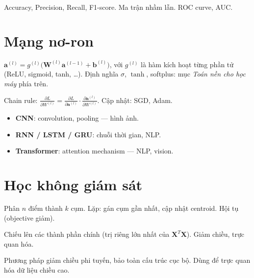 \documentclass[12pt,a4paper]{article}
\begin{document}
\begin{phuongphap}[title={Đánh giá phân loại}]
  Accuracy, Precision, Recall, F1-score. Ma trận nhầm lẫn. ROC curve, AUC.
\end{phuongphap}

\section{Mạng nơ-ron}
\label{sec:mang-no-ron}

\begin{dinhnghia}[title={Perceptron nhiều lớp (MLP)}]
  $\mathbf{a}^{(l)} = g^{(l)}\!\bigl(\mathbf{W}^{(l)}\mathbf{a}^{(l-1)} + \mathbf{b}^{(l)}\bigr)$,
  với $g^{(l)}$ là hàm kích hoạt từng phần tử (ReLU, sigmoid, tanh, \ldots).
  Định nghĩa $\sigma$, $\tanh$, softplus: mục \emph{Toán nền cho học máy} phía trên.
\end{dinhnghia}

\begin{phuongphap}[title={Backpropagation}]
  Chain rule: $\frac{\partial L}{\partial W^{(l)}} = \frac{\partial L}{\partial \mathbf{a}^{(l)}}\cdot\frac{\partial \mathbf{a}^{(l)}}{\partial W^{(l)}}$. Cập nhật: SGD, Adam.
\end{phuongphap}

\begin{tinhchat}[title={Kiến trúc phổ biến}]
  \begin{itemize}
    \item \textbf{CNN}: convolution, pooling --- hình ảnh.
    \item \textbf{RNN / LSTM / GRU}: chuỗi thời gian, NLP.
    \item \textbf{Transformer}: attention mechanism --- NLP, vision.
  \end{itemize}
\end{tinhchat}

\section{Học không giám sát}

\begin{phuongphap}[title={K-Means}]
  Phân $n$ điểm thành $k$ cụm. Lặp: gán cụm gần nhất, cập nhật centroid. Hội tụ (objective giảm).
\end{phuongphap}

\begin{phuongphap}[title={PCA}]
  Chiếu lên các thành phần chính (trị riêng lớn nhất của $\mathbf{X}^T\mathbf{X}$). Giảm chiều, trực quan hóa.
\end{phuongphap}

\begin{dinhnghia}[title={t-SNE, UMAP}]
  Phương pháp giảm chiều phi tuyến, bảo toàn cấu trúc cục bộ. Dùng để trực quan hóa dữ liệu chiều cao.
\end{dinhnghia}
\end{document}
